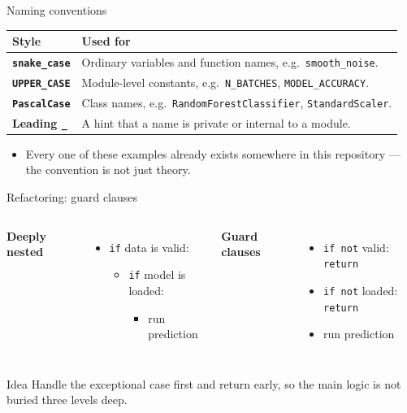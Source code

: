 \begin{frame}{Naming conventions}
\begin{tabularx}{\textwidth}{>{\bfseries}l X}
Style & Used for \\
\toprule
\texttt{snake\_case} & Ordinary variables and function names, e.g.\ \texttt{smooth\_noise}. \\
\texttt{UPPER\_CASE} & Module-level constants, e.g.\ \texttt{N\_BATCHES}, \texttt{MODEL\_ACCURACY}. \\
\texttt{PascalCase} & Class names, e.g.\ \texttt{RandomForestClassifier}, \texttt{StandardScaler}. \\
Leading \texttt{\_} & A hint that a name is private or internal to a module. \\
\bottomrule
\end{tabularx}
\vspace{0.4em}
\begin{itemize}
\item Every one of these examples already exists somewhere in this repository --- the convention is not just theory.
\end{itemize}
\coursefooter
\end{frame}

\begin{frame}{Refactoring: guard clauses}
\begin{columns}[T]
\textbf{Deeply nested}
\begin{itemize}
\item \texttt{if} data is valid:
\begin{itemize}
\item \texttt{if} model is loaded:
\begin{itemize}
\item run prediction
\end{itemize}
\end{itemize}
\end{itemize}
\textbf{Guard clauses}
\begin{itemize}
\item \texttt{if not} valid: \texttt{return}
\item \texttt{if not} loaded: \texttt{return}
\item run prediction
\end{itemize}
\end{columns}
\vspace{0.5em}
\begin{block}{Idea}
Handle the exceptional case first and return early, so the main logic is not buried three levels deep.
\end{block}
\coursefooter
\end{frame}

